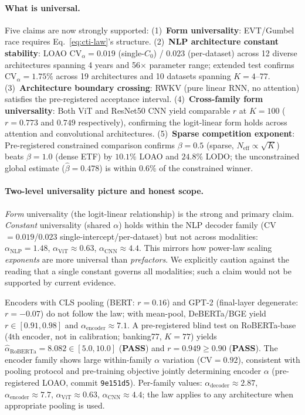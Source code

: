 \documentclass{article}
\begin{document}
\paragraph{What is universal.}
Five claims are now strongly supported:
(1)~\textbf{Form universality}: EVT/Gumbel race requires Eq.~\ref{eq:cti-law}'s structure.
(2)~\textbf{NLP architecture constant stability}: LOAO $\mathrm{CV}_\alpha=0.019$ (single-$C_0$) / $0.023$ (per-dataset) across 12 diverse architectures spanning 4 years and 56$\times$ parameter range; extended test confirms $\mathrm{CV}_\alpha=1.75\%$ across 19 architectures and 10 datasets spanning $K=4$--$77$.
(3)~\textbf{Architecture boundary crossing}: RWKV (pure linear RNN, no attention) satisfies the pre-registered acceptance interval.
(4)~\textbf{Cross-family form universality}: Both ViT and ResNet50 CNN yield comparable $r$ at $K=100$ ($r=0.773$ and $0.749$ respectively), confirming the logit-linear form holds across attention and convolutional architectures.
(5)~\textbf{Sparse competition exponent}: Pre-registered constrained comparison confirms $\beta=0.5$
(sparse, $N_\mathrm{eff}\propto\sqrt{K}$) beats $\beta=1.0$ (dense ETF) by $10.1\%$ LOAO and $24.8\%$
LODO; the unconstrained global estimate ($\hat\beta=0.478$) is within $0.6\%$ of the constrained winner.

\paragraph{Two-level universality picture and honest scope.}
\emph{Form} universality (the logit-linear relationship) is the strong and primary claim. \emph{Constant} universality (shared $\alpha$) holds within the NLP decoder family (CV$=0.019$/$0.023$ single-intercept/per-dataset) but not across modalities: $\alpha_\mathrm{NLP}=1.48$, $\alpha_\mathrm{ViT}\approx0.63$, $\alpha_\mathrm{CNN}\approx4.4$. This mirrors how power-law scaling \emph{exponents} are more universal than \emph{prefactors}. We explicitly caution against the reading that a single constant governs all modalities; such a claim would not be supported by current evidence.

Encoders with CLS pooling (BERT: $r=0.16$) and GPT-2 (final-layer degenerate: $r=-0.07$) do not follow the law; with mean-pool, DeBERTa/BGE yield $r\in[0.91,0.98]$ and $\alpha_\mathrm{encoder}\approx7.1$.
A pre-registered blind test on RoBERTa-base (4th encoder, not in calibration; banking77, $K=77$) yields $\hat\alpha_\mathrm{RoBERTa}=8.082\in[5.0,10.0]$ (\textbf{PASS}) and $r=0.949\geq0.90$ (\textbf{PASS}).
The encoder family shows large within-family $\alpha$ variation ($\mathrm{CV}=0.92$), consistent with pooling protocol and pre-training objective jointly determining encoder $\alpha$ (pre-registered LOAO, commit \texttt{9e151d5}).
Per-family values: $\alpha_\mathrm{decoder}\approx2.87$, $\alpha_\mathrm{encoder}\approx7.7$, $\alpha_\mathrm{ViT}\approx0.63$, $\alpha_\mathrm{CNN}\approx4.4$; the law applies to any architecture when appropriate pooling is used.
\end{document}
